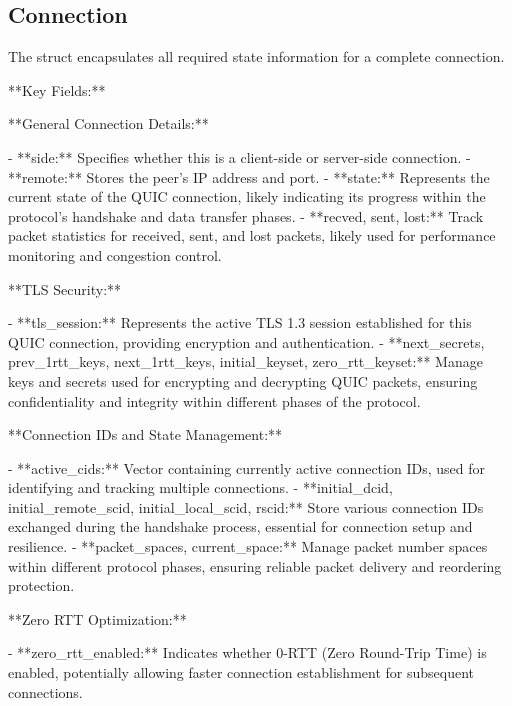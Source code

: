 \subsection{Connection}

The  struct encapsulates all required state information for a complete connection. 

**Key Fields:**

**General Connection Details:**

- **side:** Specifies whether this is a client-side or server-side connection.
- **remote:** Stores the peer's IP address and port.
- **state:** Represents the current state of the QUIC connection, likely indicating its progress within the protocol's handshake and data transfer phases.
- **recved, sent, lost:** Track packet statistics for received, sent, and lost packets, likely used for performance monitoring and congestion control.

**TLS Security:**

- **tls_session:** Represents the active TLS 1.3 session established for this QUIC connection, providing encryption and authentication.
- **next_secrets, prev_1rtt_keys, next_1rtt_keys, initial_keyset, zero_rtt_keyset:** Manage keys and secrets used for encrypting and decrypting QUIC packets, ensuring confidentiality and integrity within different phases of the protocol.

**Connection IDs and State Management:**

- **active_cids:** Vector containing currently active connection IDs, used for identifying and tracking multiple connections.
- **initial_dcid, initial_remote_scid, initial_local_scid, rscid:** Store various connection IDs exchanged during the handshake process, essential for connection setup and resilience.
- **packet_spaces, current_space:** Manage packet number spaces within different protocol phases, ensuring reliable packet delivery and reordering protection.

**Zero RTT Optimization:**

- **zero_rtt_enabled:** Indicates whether 0-RTT (Zero Round-Trip Time) is enabled, potentially allowing faster connection establishment for subsequent connections.

